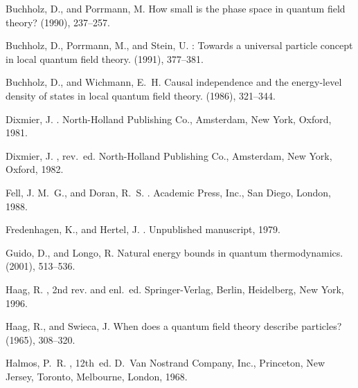 \documentclass[a4paper,a4paper]{article}
\numberwithin{equation}{section}
\theoremstyle{definition}
\theoremstyle{plain}
\theoremstyle{remark}
\theoremstyle{assumption}
\begin{document}
\begin{thebibliography}{10}
{\sc Buchholz, D., and Porrmann, M.}
\newblock How small is the phase space in quantum field theory?
 (1990),
  237--257.

{\sc Buchholz, D., Porrmann, M., and Stein, U.}
: Towards a universal particle concept in local
  quantum field theory.
 (1991), 377--381.

{\sc Buchholz, D., and Wichmann, E.~H.}
\newblock Causal independence and the energy-level density of states in local
  quantum field theory.
 (1986), 321--344.

{\sc Dixmier, J.}
.
\newblock North-Holland Publishing Co., Amsterdam, New York, Oxford, 1981.

{\sc Dixmier, J.}
, rev.~ed.
\newblock North-Holland Publishing Co., Amsterdam, New York, Oxford, 1982.

{\sc Fell, J. M.~G., and Doran, R.~S.}
.
\newblock Academic Press, Inc., San Diego, London, 1988.

{\sc Fredenhagen, K., and Hertel, J.}
.
\newblock Unpublished manuscript, 1979.

{\sc Guido, D., and Longo, R.}
\newblock Natural energy bounds in quantum thermodynamics.
 (2001), 513--536.

{\sc Haag, R.}
, 2nd rev. and enl.~ed.
\newblock Springer-Verlag, Berlin, Heidelberg, New York, 1996.

{\sc Haag, R., and Swieca, J.}
\newblock When does a quantum field theory describe particles?
 (1965), 308--320.

{\sc Halmos, P.~R.}
, 12th~ed.
\newblock D.~Van Nostrand Company, Inc., Princeton, New Jersey, Toronto,
  Melbourne, London, 1968.


\end{thebibliography}
\end{document}
